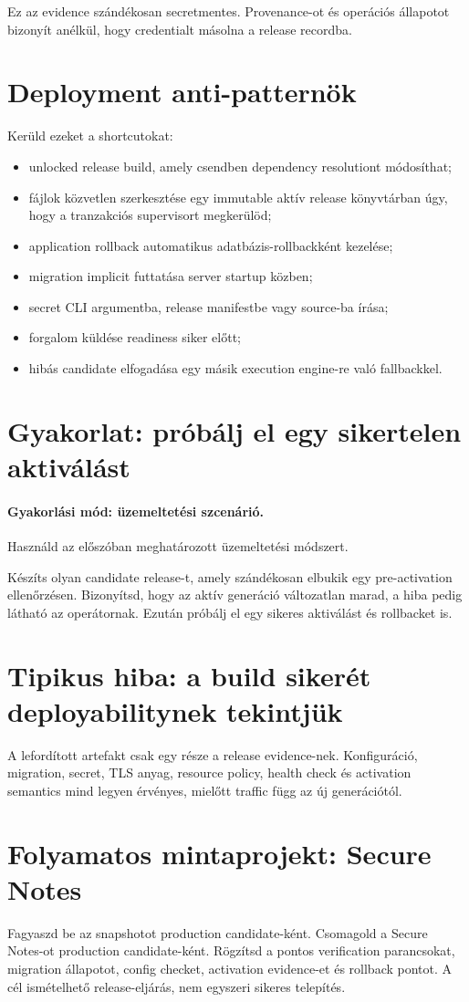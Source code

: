 Ez az evidence szándékosan secretmentes. Provenance-ot és operációs állapotot bizonyít anélkül, hogy credentialt másolna a release recordba.

\section{Deployment anti-patternök}

Kerüld ezeket a shortcutokat:

\begin{itemize}
  \item unlocked release build, amely csendben dependency resolutiont módosíthat;
  \item fájlok közvetlen szerkesztése egy immutable aktív release könyvtárban úgy, hogy a tranzakciós  supervisort megkerülöd;
  \item application rollback automatikus adatbázis-rollbackként kezelése;
  \item migration implicit futtatása server startup közben;
  \item secret CLI argumentba, release manifestbe vagy source-ba írása;
  \item forgalom küldése readiness siker előtt;
  \item hibás candidate elfogadása egy másik execution engine-re való fallbackkel.
\end{itemize}

\section{Gyakorlat: próbálj el egy sikertelen aktiválást}
\paragraph{Gyakorlási mód: üzemeltetési szcenárió.} Használd az előszóban meghatározott üzemeltetési módszert.

Készíts olyan candidate release-t, amely szándékosan elbukik egy pre-activation ellenőrzésen. Bizonyítsd, hogy az aktív generáció változatlan marad, a hiba pedig látható az operátornak. Ezután próbálj el egy sikeres aktiválást és rollbacket is.

\section{Tipikus hiba: a build sikerét deployabilitynek tekintjük}
A lefordított artefakt csak egy része a release evidence-nek. Konfiguráció, migration, secret, TLS anyag, resource policy, health check és activation semantics mind legyen érvényes, mielőtt traffic függ az új generációtól.

\section{Folyamatos mintaprojekt: Secure Notes}
Fagyaszd be az  snapshotot production candidate-ként. Csomagold a Secure Notes-ot production candidate-ként. Rögzítsd a pontos verification parancsokat, migration állapotot, config checket, activation evidence-et és rollback pontot. A cél ismételhető release-eljárás, nem egyszeri sikeres telepítés.
